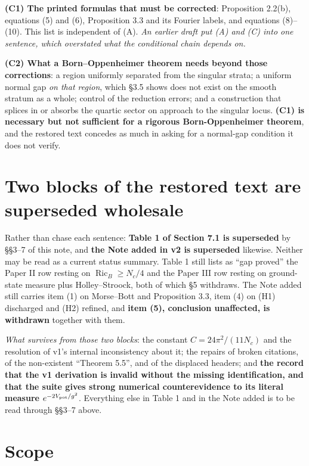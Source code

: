 \documentclass[11pt]{article}
\begin{document}
\textbf{(C1) The printed formulas that must be corrected}: Proposition 2.2(b),
equations (5) and (6), Proposition 3.3 and its Fourier labels, and equations (8)--(10).
This list is independent of (A). \emph{An earlier draft put (A) and (C) into one
sentence, which overstated what the conditional chain depends on.}

\textbf{(C2) What a Born--Oppenheimer theorem needs beyond those corrections}: a region
uniformly separated from the singular strata; a uniform normal gap \emph{on that
region}, which \S3.5 shows does not exist on the smooth stratum as a whole; control of
the reduction errors; and a construction that splices in or absorbs the quartic sector
on approach to the singular locus. \textbf{(C1) is necessary but not sufficient for a
rigorous Born-Oppenheimer theorem}, and the restored text concedes as much in asking
for a normal-gap condition it does not verify.

\section{Two blocks of the restored text are superseded wholesale}

Rather than chase each sentence: \textbf{Table 1 of Section 7.1 is superseded} by
\S\S3--7 of this note, and \textbf{the Note added in v2 is superseded} likewise.
Neither may be read as a current status summary. Table 1 still lists as ``gap proved''
the Paper II row resting on $\operatorname{Ric}_B\ge N_c/4$ and the Paper III row
resting on ground-state measure plus Holley--Stroock, both of which \S5 withdraws. The
Note added still carries item (1) on Morse--Bott and Proposition 3.3, item (4) on (H1)
discharged and (H2) refined, and \textbf{item (5), conclusion unaffected, is
withdrawn} together with them.

\emph{What survives from those two blocks}: the constant $C=24\pi^2/(11N_c)$ and the
resolution of v1's internal inconsistency about it; the repairs of broken citations,
of the non-existent ``Theorem 5.5'', and of the displaced headers; and \textbf{the
record that the v1 derivation is invalid without the missing identification, and that
the suite gives strong numerical counterevidence to its literal measure}
$e^{-2V_{\rm pot}/g^2}$. Everything else in Table 1 and in the Note added is to be
read through \S\S3--7 above.

\section{Scope}
\end{document}
